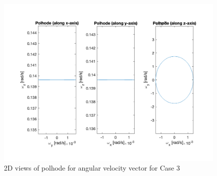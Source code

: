 \begin{figure}[H]
\centering
\includegraphics[scale=0.6]{Images/ps2_problem9_p8_z.png}
\caption{2D views of polhode for angular velocity vector for Case 3}
\label{fig:ps2_problem9_p8_z}
\end{figure}
